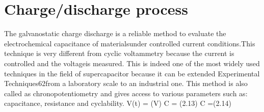 \section{Charge/discharge process}
The  galvanostatic  charge  discharge  is  a  reliable  method  to  evaluate  the  electrochemical capacitance of materialsunder controlled current conditions.This technique is very different from cyclic  voltammetry  because the current is controlled and the voltageis  measured. This  is  indeed one of the most widely used techniques  in the field of supercapacitor because  it can be extended Experimental Techniques62from  a  laboratory  scale  to  an  industrial  one.  This  method  is  also  called  as  chronopotentiometry and gives access to various parameters such as:
capacitance, resistance and cyclability.
V(t) = (V)
C = (2.13)
C =(2.14)


